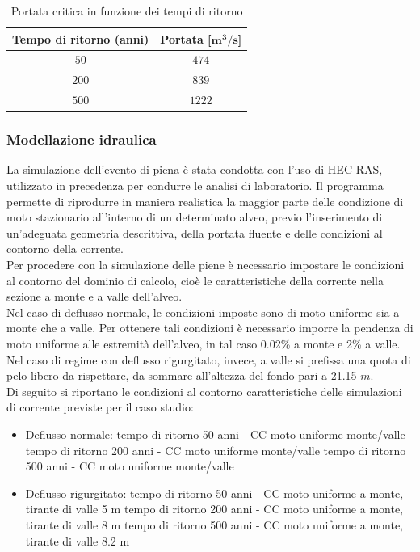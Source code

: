 \documentclass[12pt]{article} %
\begin{document}
\begin{table}[H]
    \centering
    \begin{tabular}{cc}
        \hline
        \textbf{Tempo di ritorno (anni)} & \textbf{Portata [$\mathbf{m^3/s}$]}\\
        \hline
        $50$ & $474$\\
        $200$ & $839$ \\
        $500$ & $1222$\\
        \hline
    \end{tabular}
    \caption{Portata critica in funzione dei tempi di ritorno}
\end{table}

\subsubsection{Modellazione idraulica}
\noindent La simulazione dell'evento di piena è stata condotta con l'uso di HEC-RAS, utilizzato in precedenza per condurre le analisi di laboratorio. Il programma permette di riprodurre in maniera realistica la maggior parte delle condizione di moto stazionario all'interno di un determinato alveo, previo l'inserimento di un'adeguata geometria descrittiva, della portata fluente e delle condizioni al contorno della corrente.\\
Per procedere con la simulazione delle piene è necessario impostare le condizioni al contorno del dominio di calcolo, cioè le caratteristiche della corrente nella sezione a monte e a valle dell'alveo.\\
Nel caso di deflusso normale, le condizioni imposte sono di moto uniforme sia a monte che a valle. Per ottenere tali condizioni è necessario imporre la pendenza di moto uniforme alle estremità dell'alveo, in tal caso 0.02\% a monte e 2\% a valle.\\
Nel caso di regime con deflusso rigurgitato, invece, a valle si prefissa una quota di pelo libero da rispettare, da sommare all'altezza del fondo pari a 21.15 $m$.\\
Di seguito si riportano le condizioni al contorno caratteristiche delle simulazioni di corrente previste per il caso studio:
\begin{itemize}
\item Deflusso normale:
    \subitem tempo di ritorno 50 anni - CC moto uniforme monte/valle
    \subitem tempo di ritorno 200 anni - CC moto uniforme monte/valle
    \subitem tempo di ritorno 500 anni - CC moto uniforme monte/valle
\item Deflusso rigurgitato:
\subitem tempo di ritorno 50 anni - CC moto uniforme a monte, tirante di valle 5 m
\subitem tempo di ritorno 200 anni - CC moto uniforme a monte, tirante di valle 8 m
\subitem tempo di ritorno 500 anni - CC moto uniforme a monte, tirante di valle 8.2 m

    
\end{itemize}
\end{document}
